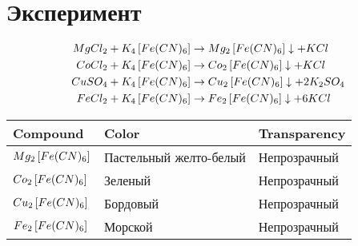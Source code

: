 \section{Эксперимент}

\begin{align} 
 MgCl_2 + K_4\left[ Fe(CN)_6 \right] &\rightarrow 
 Mg_2\left[ Fe(CN)_6 \right] \downarrow+ KCl\\
 CoCl_2 + K_4\left[ Fe(CN)_6 \right] &\rightarrow 
 Co_2\left[ Fe(CN)_6 \right] \downarrow+ KCl\\
 CuSO_4 + K_4\left[ Fe(CN)_6 \right] &\rightarrow 
 Cu_2\left[ Fe(CN)_6 \right] \downarrow + 2K_2SO_4\\
 FeCl_2 + K_4 \left[ Fe(CN)_6 \right] &\rightarrow 
 Fe_2\left[ Fe(CN)_6 \right] \downarrow + 6KCl
\end{align} 
\begin{center}
    \begin{tabular}{l||l||l}
        Compound & Color & Transparency \\ \hline \hline
        $Mg_2\left[ Fe(CN)_6 \right]$ & Пастельный желто-белый & Непрозрачный \\
        $Co_2\left[ Fe(CN)_6 \right]$  & Зеленый  & Непрозрачный \\
        $Cu_2\left[ Fe(CN)_6 \right]$ & Бордовый & Непрозрачный \\
        $Fe_2\left[ Fe(CN)_6 \right]$  & Морской & Непрозрачный 
    \end{tabular}
\end{center}
